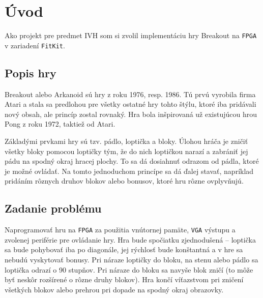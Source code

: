 \documentclass[12pt,a4paper,titlepage,final]{article}
\begin{document}
\def\author{Ivan Ševčík}
\def\email{xsevci50@stud.fit.vutbr.cz}
\def\projname{Hra Breakout}


\pagestyle{plain}
\setcounter{page}{1}
\textcolor{black}{
\tableofcontents
}

\newpage
\pagestyle{plain}
\setcounter{page}{1}


\section{Úvod} \label{uvod}

Ako projekt pre predmet IVH som si zvolil implementáciu hry Breakout na \texttt{FPGA} v zariadení \texttt{FitKit}. 

\subsection{Popis hry}
Breakout alebo Arkanoid sú hry z roku 1976, resp. 1986. Tú prvú vyrobila firma Atari a stala
sa predlohou pre všetky ostatné hry tohto štýlu, ktoré iba pridávali nový obsah, ale princíp zostal rovnaký.
Hra bola inšpirovaná už existujúcou hrou Pong z roku 1972, taktiež od Atari. 

Základými prvkami hry sú tzv. pádlo, loptička a bloky. Úlohou hráča je zničiť všetky bloky pomocou
loptičky tým, že do nich loptičkou narazí a zabrániť jej pádu na spodný okraj hracej plochy. To sa dá dosiahnuť
odrazom od pádla, ktoré je možné ovládať. Na tomto jednoduchom princípe sa dá ďalej stavať, napríklad
pridáním rôznych druhov blokov alebo bonusov, ktoré hru rôzne ovplyvňujú.  

\subsection{Zadanie problému}
Naprogramovať hru na \texttt{FPGA} za použitia vnútornej pamäte, \texttt{VGA} výstupu a zvolenej periférie pre ovládanie hry.
Hra bude spočiatku zjednodušená -- loptička sa bude pohybovať iba po diagonále, jej rýchlosť bude konštantná
a v hre sa nebudú vyskytovať bonusy. Pri náraze loptičky do bloku, na stenu alebo pádlo sa loptička odrazí o 90
stupňov. Pri náraze do bloku sa navyše blok zničí (to môže byť neskôr rozšírené o rôzne druhy blokov). Hra končí
víťazstvom pri zničení všetkých blokov alebo prehrou pri dopade na spodný okraj obrazovky.
\end{document}
